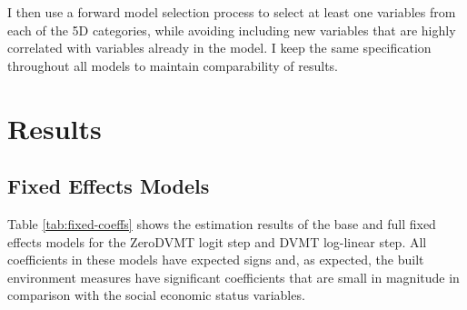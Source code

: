\documentclass[numbered]{trbunofficial}
\begin{document}
I then use a forward model selection process to select at least one variables from each of the 5D categories, while avoiding including new variables that are highly correlated with variables already in the model. I keep the same specification throughout all models to maintain comparability of results.

\hypertarget{results}{%
\section{Results}\label{results}}

\hypertarget{fixed-effects-models}{%
\subsection{Fixed Effects Models}\label{fixed-effects-models}}

Table \ref{tab:fixed-coeffs} shows the estimation results of the base and full fixed effects models for the ZeroDVMT logit step and DVMT log-linear step. All coefficients in these models have expected signs and, as expected, the built environment measures have significant coefficients that are small in magnitude in comparison with the social economic status variables.
\end{document}
